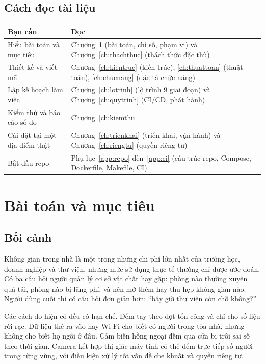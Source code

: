 \documentclass[10pt,a4paper,oneside,openany]{report}
\newcommand{\tabhead}[1]{\textsf{\bfseries\color{ink}#1}}
\newenvironment{bang}{\par\small\rowcolors{2}{rowgray}{white}}{\par\vspace{0.3em}}
\begin{document}
\section*{Cách đọc tài liệu}
\begin{bang}
\begin{tabularx}{\linewidth}{L{34mm}Y}
\toprule
\tabhead{Bạn cần} & \tabhead{Đọc} \\
\midrule
Hiểu bài toán và mục tiêu & Chương~\ref{ch:baitoan} (bài toán, chỉ số, phạm vi) và Chương~\ref{ch:thachthuc} (thách thức đặc thù) \\
Thiết kế và viết mã & Chương~\ref{ch:kientruc} (kiến trúc), \ref{ch:thuattoan} (thuật toán), \ref{ch:chucnang} (đặc tả chức năng) \\
Lập kế hoạch làm việc & Chương~\ref{ch:lotrinh} (lộ trình 9 giai đoạn) và Chương~\ref{ch:quytrinh} (CI/CD, phát hành) \\
Kiểm thử và báo cáo số đo & Chương~\ref{ch:kiemthu} \\
Cài đặt tại một địa điểm thật & Chương~\ref{ch:trienkhai} (triển khai, vận hành) và Chương~\ref{ch:riengtu} (quyền riêng tư) \\
Bắt đầu repo & Phụ lục~\ref{app:repo} đến~\ref{app:ci} (cấu trúc repo, Compose, Dockerfile, Makefile, CI) \\
\bottomrule
\end{tabularx}
\end{bang}

\tableofcontents
\clearpage
{}
\chapter{Bài toán và mục tiêu}\label{ch:baitoan}

\section{Bối cảnh}
Không gian trong nhà là một trong những chi phí lớn nhất của trường học, doanh nghiệp và thư viện, nhưng mức sử dụng
thực tế thường chỉ được ước đoán. Có ba câu hỏi người quản lý cơ sở vật chất hay gặp: phòng nào thường xuyên quá tải,
phòng nào bị lãng phí, và nên mở thêm hay thu hẹp không gian nào. Người dùng cuối thì có câu hỏi đơn giản hơn:
\enquote{bây giờ thư viện còn chỗ không?}

Các cách đo hiện có đều có hạn chế. Đếm tay theo đợt tốn công và chỉ cho số liệu rời rạc. Dữ liệu thẻ ra vào hay Wi-Fi
cho biết có người trong tòa nhà, nhưng không cho biết họ ngồi ở đâu. Cảm biến hồng ngoại đếm qua cửa bị trôi sai số theo
thời gian. Camera kết hợp thị giác máy tính có thể đếm trực tiếp số người trong từng vùng, với điều kiện xử lý tốt
vấn đề che khuất và quyền riêng tư.
\end{document}
